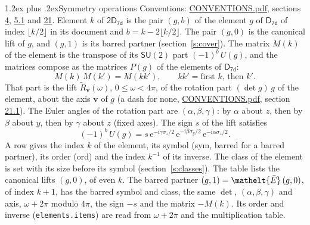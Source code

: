 \documentclass[10pt,a4paper]{article}
\makeatletter
\renewcommand\section{\@startsection{section}{1}{\z@}{-3ex plus -1ex minus -.2ex}%
  {1.2ex plus .2ex}{\normalfont\large\sffamily\bfseries\color{parttitle}}}
\numberwithin{equation}{section}
\newcommand{\eltfont}[1]{{\let\sigma\eltsigma\mathelt{#1}}}
\newcommand{\grp}[1]{\mathsf{#1}}
\newcommand{\elt}[1]{\eltfont{#1}}
\newcommand{\vv}{\mathbf{v}}
\newcommand{\iunit}{\mathrm{i}}
\newcommand{\expe}{\mathrm{e}}
\newcommand{\barred}[1]{\bar{#1}}
\newcommand{\lift}[1]{\tilde{#1}}
\newcommand{\pauli}[1]{\sigma_{#1}}
\makeatother
\begin{document}
\section{Symmetry operations}\label{s:elements}
Conventions: \href{../../CONVENTIONS.pdf}{CONVENTIONS.pdf}, sections \href{../../../rotation/CONVENTIONS.pdf\#conv.4}{4}, \href{../../../rotation/CONVENTIONS.pdf\#conv.5.1}{5.1} and \href{../../CONVENTIONS.pdf\#conv.21}{21}.
\leavevmode\label{n:index.element}\label{n:element.g}Element $k$ of $\grp{2D_{7d}}$ is the pair $(g, b)$ of the element $g$ of \href{../../../rotation/data/pdf/D7d.pdf}{$\grp{D_{7d}}$} of index $\lfloor k/2\rfloor$ in its document and $b = k - 2\lfloor k/2\rfloor$. The pair $(g, 0)$ is the canonical lift of $g$, and $(g, 1)$ is its barred partner (section~\ref{s:cover}). \label{n:matrix.element.pin}\label{n:matrix.element}The matrix $M(k)$ of the element is the transpose of its $\grp{SU(2)}$ part $(-1)^{b}\,U(g)$, and the matrices compose as the matrices $P(g)$ of the elements of $\grp{D_{7d}}$:
\begin{equation}\label{e:mprod}M(k)\,M(k') = M(kk'),\qquad kk' = \text{first } k\text{, then } k'.\end{equation}
\leavevmode\label{n:angle.omega}\label{n:vector.axis}\label{n:vector.pole}That part is the lift $\lift{R}_{\vv}(\omega)$, $0 \le \omega < 4\pi$, of the rotation part $(\det g)\,g$ of the element, about the axis $\vv$ of $g$ (a dash for none, \href{../../CONVENTIONS.pdf}{CONVENTIONS.pdf}, section \href{../../CONVENTIONS.pdf\#conv.21.1}{21.1}). \label{n:angle.euler.alpha}\label{n:angle.euler.beta}\label{n:angle.euler.gamma}\label{n:vector.coordinates}The Euler angles of the rotation part are $(\alpha,\beta,\gamma)$: by $\alpha$ about $z$, then by $\beta$ about $y$, then by $\gamma$ about $z$ (fixed axes). \label{n:local.euler.sign}The sign $s$ of the lift satisfies
\begin{equation}\label{e:euler}(-1)^{b}\,U(g) = s\,\expe^{-\iunit\gamma\pauli{z}/2}\,\expe^{-\iunit\beta\pauli{y}/2}\,\expe^{-\iunit\alpha\pauli{z}/2}.\end{equation}
\leavevmode\label{n:index.element.inverse}\label{n:head.sym}\label{n:head.ord}A row gives the index $k$ of the element, its symbol (sym, barred for a barred partner), its order (ord) and the index $k^{-1}$ of its inverse. \label{n:head.class}The class of the element is set with its size before its symbol (section~\ref{s:classes}).
The table lists the canonical lifts $(g, 0)$, of even $k$. The barred partner $(g, 1) = \elt{\barred{E}}\,(g, 0)$, of index $k + 1$, has the barred symbol and class, the same $\det$, $(\alpha,\beta,\gamma)$ and axis, $\omega + 2\pi$ modulo $4\pi$, the sign $-s$ and the matrix $-M(k)$. Its order and inverse (\texttt{elements.items}) are read from $\omega + 2\pi$ and the multiplication table.
\end{document}

